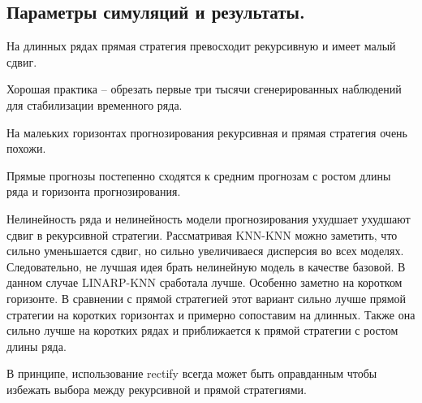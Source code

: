 \documentclass[a4paper,12pt]{article}
\begin{document}
\subsection{Параметры симуляций и результаты.}

На длинных рядах прямая стратегия превосходит рекурсивную и имеет малый сдвиг.

Хорошая практика -- обрезать первые три тысячи сгенерированных наблюдений для стабилизации временного ряда.

На малеьких горизонтах прогнозирования рекурсивная и прямая стратегия очень похожи.

Прямые прогнозы постепенно сходятся к средним прогнозам с ростом длины ряда и горизонта прогнозирования. 



Нелинейность ряда и нелинейность модели прогнозирования ухудшает ухудшают сдвиг в рекурсивной стратегии. Рассматривая KNN-KNN можно заметить, что сильно уменьшается сдвиг, но сильно увеличиваеся дисперсия во всех моделях. Следовательно, не лучшая идея брать нелинейную модель в качестве базовой. В данном случае LINARP-KNN сработала лучше. Особенно заметно на коротком горизонте. В сравнении с прямой стратегией этот вариант сильно лучше прямой стратегии на коротких горизонтах и примерно сопоставим на длинных. Также она сильно лучше на коротких рядах и приближается к прямой стратегии с ростом длины ряда.

В принципе, использование rectify всегда может быть оправданным чтобы избежать выбора между рекурсивной и прямой стратегиями.
\end{document}
